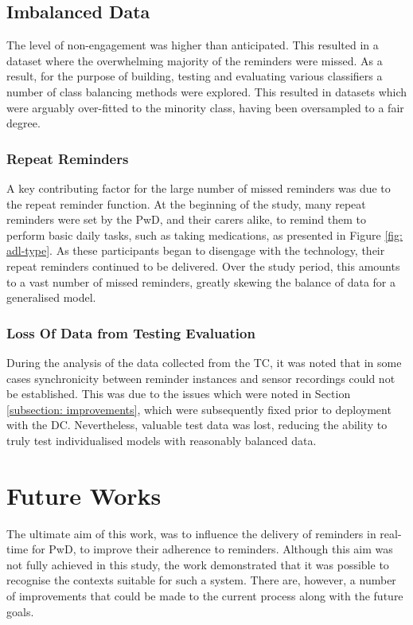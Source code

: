 \subsection{Imbalanced Data}
The level of non-engagement was higher than anticipated. This resulted in a dataset where the overwhelming majority of the reminders were missed. As a result, for the purpose of building, testing and evaluating various classifiers a number of class balancing methods were explored. This resulted in datasets which were arguably over-fitted to the minority class, having been oversampled to a fair degree.

\subsubsection{Repeat Reminders}
A key contributing factor for the large number of missed reminders was due to the repeat reminder function. At the beginning of the study, many repeat reminders were set by the PwD, and their carers alike, to remind them to perform basic daily tasks, such as taking medications, as presented in Figure \ref{fig: adl-type}. As these participants began to disengage with the technology, their repeat reminders continued to be delivered. Over the study period, this amounts to a vast number of missed reminders, greatly skewing the balance of data for a generalised model.

\subsubsection{Loss Of Data from Testing Evaluation}
During the analysis of the data collected from the TC, it was noted that in some cases synchronicity between reminder instances and sensor recordings could not be established. This was due to the issues which were noted in Section \ref{subsection: improvements}, which were subsequently fixed prior to deployment with the DC. Nevertheless, valuable test data was lost, reducing the ability to truly test individualised models with reasonably balanced data.

\section{Future Works}
The ultimate aim of this work, was to influence the delivery of reminders in real-time for PwD, to improve their adherence to reminders. Although this aim was not fully achieved in this study, the work demonstrated that it was possible to recognise the contexts suitable for such a system. There are, however, a number of improvements that could be made to the current process along with the future goals.

